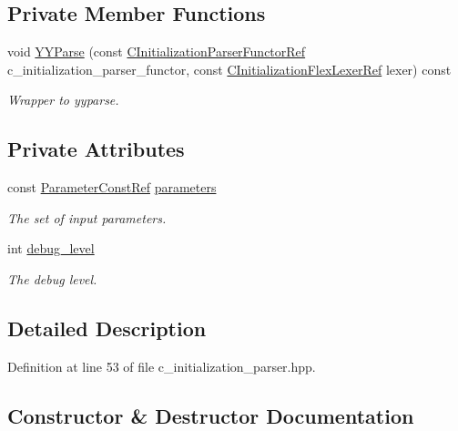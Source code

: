 \subsection*{Private Member Functions}
\begin{DoxyCompactItemize}
\item 
void \hyperlink{classCInitializationParser_a704d7f054b52727705ba9f1d9b1c56f1}{Y\+Y\+Parse} (const \hyperlink{c__initialization__parser__functor_8hpp_a6ef48614177b399e30c2c728bd1aa4a0}{C\+Initialization\+Parser\+Functor\+Ref} c\+\_\+initialization\+\_\+parser\+\_\+functor, const \hyperlink{c__initialization__flex__lexer_8hpp_a571e9c81197651ff0497743befda055c}{C\+Initialization\+Flex\+Lexer\+Ref} lexer) const
\begin{DoxyCompactList}\small\item\em Wrapper to yyparse. \end{DoxyCompactList}\end{DoxyCompactItemize}
\subsection*{Private Attributes}
\begin{DoxyCompactItemize}
\item 
const \hyperlink{Parameter_8hpp_a37841774a6fcb479b597fdf8955eb4ea}{Parameter\+Const\+Ref} \hyperlink{classCInitializationParser_a22401e9e15572a141c0d08a6290c612b}{parameters}
\begin{DoxyCompactList}\small\item\em The set of input parameters. \end{DoxyCompactList}\item 
int \hyperlink{classCInitializationParser_ace27f0d73687b6f9ed247ecaffe452fe}{debug\+\_\+level}
\begin{DoxyCompactList}\small\item\em The debug level. \end{DoxyCompactList}\end{DoxyCompactItemize}


\subsection{Detailed Description}


Definition at line 53 of file c\+\_\+initialization\+\_\+parser.\+hpp.



\subsection{Constructor \& Destructor Documentation}
\mbox{\label{classCInitializationParser_a0d406a9678838a7b052d4b16345efa65}} 
